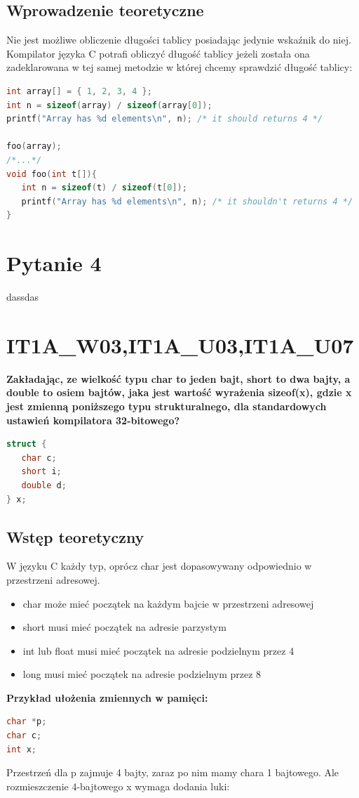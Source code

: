 \subsection{Wprowadzenie teoretyczne}
Nie jest możliwe obliczenie długości tablicy posiadając jedynie wskaźnik do niej.\\
Kompilator języka C potrafi obliczyć długość tablicy jeżeli została ona zadeklarowana w tej samej metodzie w której chcemy sprawdzić długość tablicy:
\begin{lstlisting}[language=c]
int array[] = { 1, 2, 3, 4 };
int n = sizeof(array) / sizeof(array[0]);
printf("Array has %d elements\n", n); /* it should returns 4 */

foo(array);
/*...*/
void foo(int t[]){
   int n = sizeof(t) / sizeof(t[0]);
   printf("Array has %d elements\n", n); /* it shouldn't returns 4 */
}
\end{lstlisting}


\section{Pytanie 4}dassdas


\section{IT1A\_W03,IT1A\_U03,IT1A\_U07}
\textbf{Zakładając, ze wielkość typu char to jeden bajt, short to dwa bajty, a double to osiem bajtów, jaka jest wartość wyrażenia sizeof(x), gdzie x jest zmienną poniższego typu strukturalnego, dla standardowych ustawień kompilatora 32-bitowego?}
\begin{lstlisting}[language=c]
struct {
   char c;
   short i;
   double d;
} x;
\end{lstlisting}

\subsection{Wstęp teoretyczny}
W języku C każdy typ, oprócz char jest dopasowywany odpowiednio w przestrzeni adresowej.
\begin{itemize}
\item char może mieć początek na każdym bajcie w przestrzeni adresowej
\item short musi mieć początek na adresie parzystym
\item int lub float musi mieć początek na adresie podzielnym przez 4
\item long musi mieć początek na adresie podzielnym przez 8
\end{itemize}
\textbf{Przykład ułożenia zmiennych w pamięci: }
\begin{lstlisting}[language=c]
char *p;
char c;
int x;
\end{lstlisting}
Przestrzeń dla p zajmuje 4 bajty, zaraz po nim mamy chara 1 bajtowego. Ale rozmieszczenie 4-bajtowego x wymaga dodania luki:

